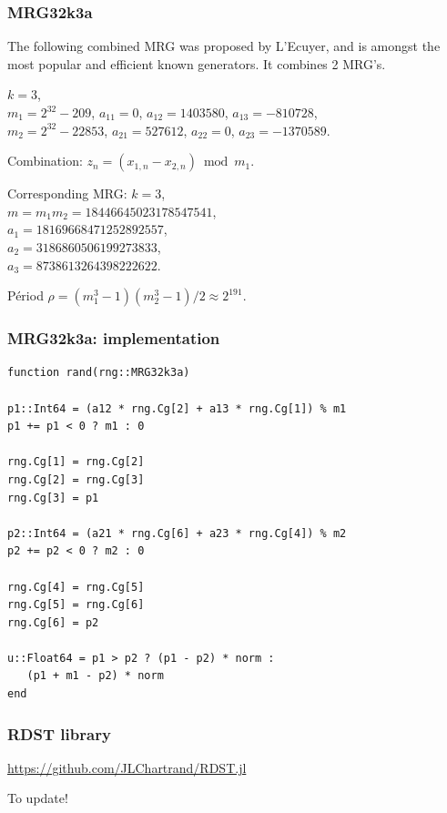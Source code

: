 \documentclass{beamer}
\begin{document}
	\begin{frame}
		\frametitle{MRG32k3a}
		
		The following combined MRG was proposed by L'Ecuyer, and is amongst
		the most popular and efficient known generators.
		It combines 2 MRG's.
		
		\mbox{}
		
		$k=3$, \\
		$m_1 = 2^{32} -209$, $a_{11} = 0$, $a_{12} = 1403580$, $a_{13} = -810728$,\\
		$m_2 = 2^{32}-22853$, $a_{21} = 527612$, $a_{22} = 0$, $a_{23} = -1370589$.\\
		
		\mbox{}
		
		Combination: $z_n = (x_{1,n} - x_{2,n}) \bmod m_1$.
		
		\mbox{}
		
		Corresponding MRG: $k=3$,\\
		$m = m_1 m_2 = 18446645023178547541$, \\
		$a_{1} = 18169668471252892557$,\\
		$a_{2} = 3186860506199273833$,\\ 
		$a_{3} = 8738613264398222622$.
		
		\mbox{}
		
		P\'eriod $\rho = (m_1^3-1)(m_2^3-1)/2 \approx 2^{191}$.
	\end{frame}
	
	\begin{frame}[containsverbatim]
		\frametitle{MRG32k3a: implementation}
		
		\begin{footnotesize}
			\begin{verbatim}
function rand(rng::MRG32k3a)

p1::Int64 = (a12 * rng.Cg[2] + a13 * rng.Cg[1]) % m1
p1 += p1 < 0 ? m1 : 0

rng.Cg[1] = rng.Cg[2]
rng.Cg[2] = rng.Cg[3]
rng.Cg[3] = p1

p2::Int64 = (a21 * rng.Cg[6] + a23 * rng.Cg[4]) % m2
p2 += p2 < 0 ? m2 : 0

rng.Cg[4] = rng.Cg[5]
rng.Cg[5] = rng.Cg[6]
rng.Cg[6] = p2

u::Float64 = p1 > p2 ? (p1 - p2) * norm :
   (p1 + m1 - p2) * norm
end
			\end{verbatim}
			\end{footnotesize}
			
		\end{frame}
		
		\begin{frame}[containsverbatim]
			\frametitle{RDST library}
			
\url{https://github.com/JLChartrand/RDST.jl}		

\mbox{}

To update!
		
	\end{frame}
	
\end{document}
